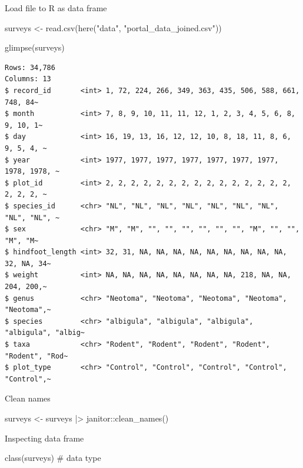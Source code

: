 \documentclass[
  letterpaper,
  DIV=11,
  numbers=noendperiod]{scrreprt}
\newenvironment{Shaded}{\begin{snugshade}}{\end{snugshade}}
\newcommand{\CommentTok}[1]{\textcolor[rgb]{0.37,0.37,0.37}{#1}}
\newcommand{\FunctionTok}[1]{\textcolor[rgb]{0.28,0.35,0.67}{#1}}
\newcommand{\NormalTok}[1]{\textcolor[rgb]{0.00,0.23,0.31}{#1}}
\newcommand{\OtherTok}[1]{\textcolor[rgb]{0.00,0.23,0.31}{#1}}
\newcommand{\SpecialCharTok}[1]{\textcolor[rgb]{0.37,0.37,0.37}{#1}}
\newcommand{\StringTok}[1]{\textcolor[rgb]{0.13,0.47,0.30}{#1}}
\begin{document}
Load file to R as data frame

\begin{Shaded}
\begin{Highlighting}[]
\NormalTok{surveys }\OtherTok{\textless{}{-}} \FunctionTok{read.csv}\NormalTok{(}\FunctionTok{here}\NormalTok{(}\StringTok{"data"}\NormalTok{, }\StringTok{"portal\_data\_joined.csv"}\NormalTok{))}

\FunctionTok{glimpse}\NormalTok{(surveys)}
\end{Highlighting}
\end{Shaded}

\begin{verbatim}
Rows: 34,786
Columns: 13
$ record_id       <int> 1, 72, 224, 266, 349, 363, 435, 506, 588, 661, 748, 84~
$ month           <int> 7, 8, 9, 10, 11, 11, 12, 1, 2, 3, 4, 5, 6, 8, 9, 10, 1~
$ day             <int> 16, 19, 13, 16, 12, 12, 10, 8, 18, 11, 8, 6, 9, 5, 4, ~
$ year            <int> 1977, 1977, 1977, 1977, 1977, 1977, 1977, 1978, 1978, ~
$ plot_id         <int> 2, 2, 2, 2, 2, 2, 2, 2, 2, 2, 2, 2, 2, 2, 2, 2, 2, 2, ~
$ species_id      <chr> "NL", "NL", "NL", "NL", "NL", "NL", "NL", "NL", "NL", ~
$ sex             <chr> "M", "M", "", "", "", "", "", "", "M", "", "", "M", "M~
$ hindfoot_length <int> 32, 31, NA, NA, NA, NA, NA, NA, NA, NA, NA, 32, NA, 34~
$ weight          <int> NA, NA, NA, NA, NA, NA, NA, NA, 218, NA, NA, 204, 200,~
$ genus           <chr> "Neotoma", "Neotoma", "Neotoma", "Neotoma", "Neotoma",~
$ species         <chr> "albigula", "albigula", "albigula", "albigula", "albig~
$ taxa            <chr> "Rodent", "Rodent", "Rodent", "Rodent", "Rodent", "Rod~
$ plot_type       <chr> "Control", "Control", "Control", "Control", "Control",~
\end{verbatim}

Clean names

\begin{Shaded}
\begin{Highlighting}[]
\NormalTok{surveys }\OtherTok{\textless{}{-}}\NormalTok{ surveys }\SpecialCharTok{|\textgreater{}} 
\NormalTok{  janitor}\SpecialCharTok{::}\FunctionTok{clean\_names}\NormalTok{()}
\end{Highlighting}
\end{Shaded}

Inspecting data frame

\begin{Shaded}
\begin{Highlighting}[]
\FunctionTok{class}\NormalTok{(surveys) }\CommentTok{\# data type}
\end{Highlighting}
\end{Shaded}
\end{document}
